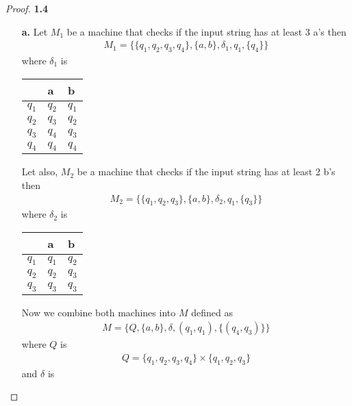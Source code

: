 \documentclass[11pt]{article}
\theoremstyle{definition}
\begin{document}
\cleardoublepage
\begin{proof}{\textbf{1.4}}
    \begin{itemize}
        \item[\textbf{a.}] Let $M_1$ be a machine that checks if
        the input string has at least 3 a's then
        \begin{align*}
            M_1 = \{\{q_1, q_2, q_3, q_4\}, \{a,b\}, \delta_1, q_1, \{q_4\}\}
        \end{align*}
        where $\delta_1$ is 
        \begin{center}
        \begin{tabular}{l|ll}
                  & a     & b     \\ \hline
            $q_1$ & $q_2$ & $q_1$ \\
            $q_2$ & $q_3$ & $q_2$ \\
            $q_3$ & $q_4$ & $q_3$ \\
            $q_4$ & $q_4$ & $q_4$ \\
        \end{tabular}
        \end{center}
        Let also, $M_2$ be a machine that checks if the input string has
        at least 2 b's then
        \begin{align*}
            M_2 = \{\{q_1, q_2, q_3\}, \{a,b\}, \delta_2, q_1, \{q_3\}\}
        \end{align*}
        where $\delta_2$ is 
        \begin{center}
        \begin{tabular}{l|ll}
                  & a     & b     \\ \hline
            $q_1$ & $q_1$ & $q_2$ \\
            $q_2$ & $q_2$ & $q_3$ \\
            $q_3$ & $q_3$ & $q_3$ \\
        \end{tabular}
        \end{center}
        Now we combine both machines into $M$ defined as
        \begin{align*}
            M = \{Q, \{a,b\}, \delta, (q_1,q_1), \{(q_4, q_3)\}\}
        \end{align*}
        where $Q$ is 
        \begin{align*}
            Q =\{q_1, q_2, q_3, q_4\} \times \{q_1, q_2, q_3\}
        \end{align*}
        and $\delta$ is 
        \begin{center}

\end{center}
\end{itemize}
\end{proof}
\end{document}
